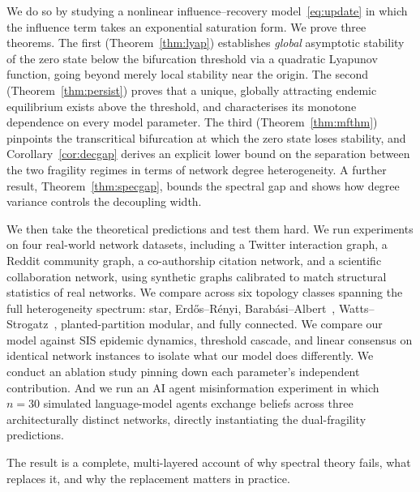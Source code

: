 \documentclass[10pt,twocolumn]{article}
\theoremstyle{myproof}
\begin{document}
We do so by studying a nonlinear influence--recovery model~\eqref{eq:update} in which the
influence term takes an exponential saturation form. We prove three theorems. The first
(Theorem~\ref{thm:lyap}) establishes \emph{global} asymptotic stability of the zero state below
the bifurcation threshold via a quadratic Lyapunov function, going beyond merely local stability near the
origin. The second (Theorem~\ref{thm:persist}) proves that a unique, globally attracting endemic
equilibrium exists above the threshold, and characterises its monotone dependence on every model
parameter. The third (Theorem~\ref{thm:mfthm}) pinpoints the transcritical bifurcation at which
the zero state loses stability, and Corollary~\ref{cor:decgap} derives an explicit lower bound on
the separation between the two fragility regimes in terms of network degree heterogeneity. A
further result, Theorem~\ref{thm:specgap}, bounds the spectral gap and shows how degree variance
controls the decoupling width.

We then take the theoretical predictions and test them hard. We run experiments on four real-world
network datasets, including a Twitter interaction graph, a Reddit community graph, a co-authorship citation
network, and a scientific collaboration network, using synthetic graphs calibrated to match
structural statistics of real networks. We
compare across six topology classes spanning the full heterogeneity spectrum: star, Erd\H{o}s--R\'{e}nyi,
Barab\'{a}si--Albert~\cite{barabasi1999}, Watts--Strogatz~\cite{watts2002}, planted-partition
modular, and fully connected. We compare our model against SIS epidemic dynamics, threshold
cascade, and linear consensus on identical network instances to isolate what our model does
differently. We conduct an ablation study pinning down each parameter's independent contribution.
And we run an AI agent misinformation experiment in which $n=30$ simulated language-model agents
exchange beliefs across three architecturally distinct networks, directly instantiating the
dual-fragility predictions.

The result is a complete, multi-layered account of why spectral theory fails, what replaces it,
and why the replacement matters in practice.
\end{document}
